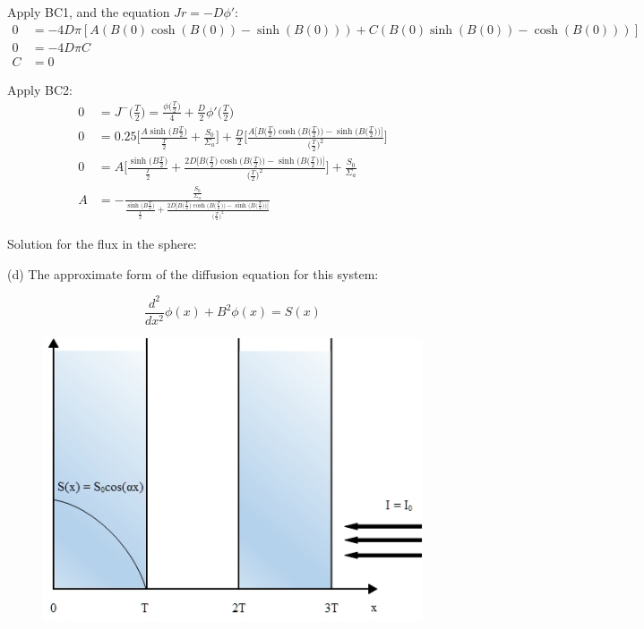 \documentclass{amsart}
\theoremstyle{definition}
\begin{document}
Apply BC1, and the equation $Jr = -D\phi'$:
\begin{align*}
    0 &= -4D\pi[A(B(0)\cosh(B(0))-\sinh(B(0)))+C(B(0)\sinh(B(0))-\cosh(B(0)))] \\
    0 &= -4D\pi C \\
    C &= 0
\end{align*}


Apply BC2:
\begin{align*}
    0 &= J^-\bigg(\frac{T}{2}\bigg) = \frac{\phi\bigg(\frac{T}{2}\bigg)}{4} +\frac{D}{2}\phi'\bigg(\frac{T}{2}\bigg) \\
    0 &= 0.25\Bigg[\frac{A\sinh\bigg(B\frac{T}{2}\bigg)}{\frac{T}{2}}+\frac{S_0}{\Sigma_a}\Bigg] +\frac{D}{2}\Bigg[\frac{A\bigg[B\bigg(\frac{T}{2}\bigg)\cosh\bigg(B\bigg(\frac{T}{2}\bigg)\bigg)-\sinh\bigg(B\bigg(\frac{T}{2}\bigg)\bigg)\bigg]}{\bigg(\frac{T}{2}\bigg)^2}\Bigg] \\
    0 &= A\Bigg[\frac{\sinh\bigg(B\frac{T}{2}\bigg)}{\frac{T}{2}}+\frac{2D\bigg[B\bigg(\frac{T}{2}\bigg)\cosh\bigg(B\bigg(\frac{T}{2}\bigg)\bigg)-\sinh\bigg(B\bigg(\frac{T}{2}\bigg)\bigg)\bigg]}{\bigg(\frac{T}{2}\bigg)^2}\Bigg]+\frac{S_0}{\Sigma_a} \\
    A &= -\frac{\frac{S_0}{\Sigma_a}}{\frac{\sinh\bigg(B\frac{T}{2}\bigg)}{\frac{T}{2}}+\frac{2D\bigg[B\bigg(\frac{T}{2}\bigg)\cosh\bigg(B\bigg(\frac{T}{2}\bigg)\bigg)-\sinh\bigg(B\bigg(\frac{T}{2}\bigg)\bigg)\bigg]}{\bigg(\frac{T}{2}\bigg)^2}}
\end{align*}


Solution for the flux in the sphere:
\bigbreak
{}


(d) The approximate form of the diffusion equation for this system:
\bigbreak

\begin{equation*}
    \frac{d^2}{dx^2}\phi(x) + B^2\phi(x) = S(x)
\end{equation*}
 
\begin{figure}[h!]
    \includegraphics[width=.45\linewidth]{P1d}
\end{figure}
\bigbreak
\end{document}
